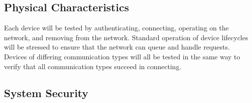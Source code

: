\documentclass[tikz,a4paper,titlepage]{article}
\begin{document}
\subsection{Physical Characteristics} %

Each device will be tested by authenticating, connecting, operating on the network, and removing from the network. Standard operation of device lifecycles will be stressed to ensure that the network can queue and handle requests. Devices of differing communication types will all be tested in the same way to verify that all communication types succeed in connecting.





\subsection{System Security} %
\label{SysSec}

\end{document}
